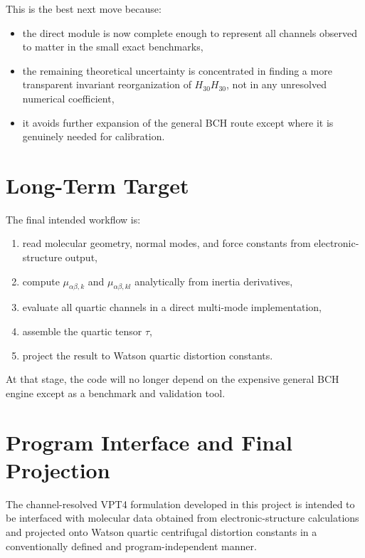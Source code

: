 \documentclass[11pt,a4paper]{article}
\begin{document}
This is the best next move because:
\begin{itemize}[leftmargin=*]
\item the direct module is now complete enough to represent all channels observed to matter in the small exact benchmarks,
\item the remaining theoretical uncertainty is concentrated in finding a more transparent invariant reorganization of \(H_{30}H_{30}\), not in any unresolved numerical coefficient,
\item it avoids further expansion of the general BCH route except where it is genuinely needed for calibration.
\end{itemize}

\section{Long-Term Target}
The final intended workflow is:
\begin{enumerate}[leftmargin=*]
\item read molecular geometry, normal modes, and force constants from electronic-structure output,
\item compute \( \mu_{\alpha\beta,k} \) and \( \mu_{\alpha\beta,kl} \) analytically from inertia derivatives,
\item evaluate all quartic channels in a direct multi-mode implementation,
\item assemble the quartic tensor \( \tau \),
\item project the result to Watson quartic distortion constants.
\end{enumerate}

At that stage, the code will no longer depend on the expensive general BCH engine except as a benchmark and validation tool.

\section{Program Interface and Final Projection}
The channel-resolved VPT4 formulation developed in this project is intended to be interfaced with molecular data obtained from electronic-structure calculations and projected onto Watson quartic centrifugal distortion constants in a conventionally defined and program-independent manner.
\end{document}
